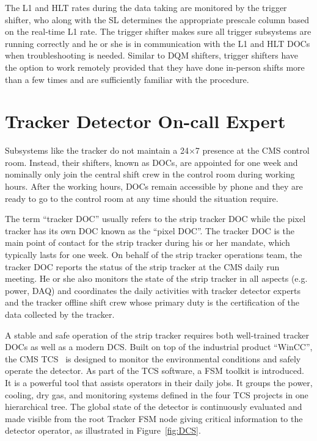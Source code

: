 The \ac{L1} and \ac{HLT} rates during the data taking are monitored by the trigger shifter, who along with the \ac{SL} determines the appropriate prescale column based on the real-time \ac{L1} rate. The trigger shifter makes sure all trigger subsystems are running correctly and he or she is in communication with the \ac{L1} and \ac{HLT} \acp{DOC} when troubleshooting is needed. Similar to \ac{DQM} shifters, trigger shifters have the option to work remotely provided that they have done in-person shifts more than a few times and are sufficiently familiar with the procedure. 

\section{Tracker Detector On-call Expert}
\label{sec:DOC}

Subsystems like the tracker do not maintain a 24$\times$7 presence at the \ac{CMS} control room. Instead, their shifters, known as \acp{DOC}, are appointed for one week and nominally only join the central shift crew in the control room during working hours. After the working hours, \acp{DOC} remain accessible by phone and they are ready to go to the control room at any time should the situation require. 

The term ``tracker \ac{DOC}'' usually refers to the strip tracker \ac{DOC} while the pixel tracker has its own \ac{DOC} known as the ``pixel \ac{DOC}''. The tracker \ac{DOC} is the main point of contact for the strip tracker during his or her mandate, which typically lasts for one week. On behalf of the strip tracker operations team, the tracker \ac{DOC} reports the status of the strip tracker at the \ac{CMS} daily run meeting. He or she also monitors the state of the strip tracker in all aspects (e.g. power, \ac{DAQ}) and coordinates the daily activities with tracker detector experts and the tracker offline shift crew whose primary duty is the certification of the data collected by the tracker. 

A stable and safe operation of the strip tracker requires both well-trained tracker \acp{DOC} as well as a modern \ac{DCS}. Built on top of the industrial product “WinCC”, the \ac{CMS} \ac{TCS}~\cite{Shah:2009zz,Karimeh:2020tzx} is designed to monitor the environmental conditions and safely operate the detector. As part of the \ac{TCS} software, a \ac{FSM} toolkit is introduced. It is a powerful tool that assists operators in their daily jobs. It groups the power, cooling, dry gas, and monitoring systems defined in the four \ac{TCS} projects in one hierarchical tree. The global state of the detector is continuously evaluated and made visible from the root Tracker \ac{FSM} node giving critical information to the detector operator, as illustrated in Figure~\ref{fig:DCS}.


